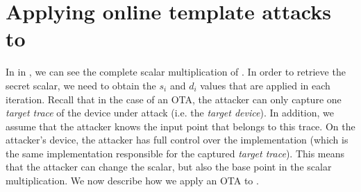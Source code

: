\section{\texorpdfstring{Applying online template attacks to \fourq}{Applying online template attacks to FourQ}}
In  in , we can see the complete scalar multiplication of \fourq.
In order to retrieve the secret scalar, we need to obtain the $s_i$ and $d_i$ values that are applied in each iteration.
Recall that in the case of an OTA, the attacker can only capture one \emph{target trace} of the device under attack (i.e. the \emph{target device}).
In addition, we assume that the attacker knows the input point that belongs to this trace.
On the attacker's device, the attacker has full control over the implementation (which is the same implementation responsible for the captured \emph{target trace}).
This means that the attacker can change the scalar, but also the base point in the scalar multiplication.
We now describe how we apply an OTA to {\fourq}.
%
